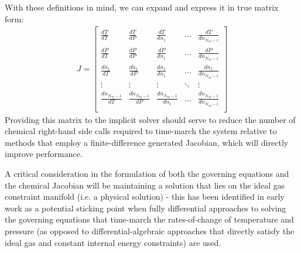 With these definitions in mind, we can expand  and express
it in true matrix form:
\begin{align}
J = \begin{bmatrix} \frac{d\dot{T}}{dT} & \frac{d\dot{T}}{dP} & \frac{d\dot{T}}{dn_{1}} & \hdots & \frac{d\dot{T}}{dn_{N_{sp}-1}} \\
                    \frac{d\dot{P}}{dT} & \frac{d\dot{P}}{dP} & \frac{d\dot{P}}{dn_{1}} & \hdots & \frac{d\dot{P}}{dn_{N_{sp}-1}} \\
		    \frac{d\dot{n}_{1}}{dT} & \frac{d\dot{n}_{1}}{dP} & \frac{d\dot{n}_{1}}{dn_{1}} & \hdots & \frac{d\dot{n}_{1}}{dn_{N_{sp}-1}} \\
		    \vdots & \vdots & \vdots & \ddots & \vdots \\
		    \frac{d\dot{n}_{N_{sp}-1}}{dT} & \frac{d\dot{n}_{N_{sp}-1}}{dP} & \frac{d\dot{n}_{N_{sp}-1}}{dn_{1}} & \hdots & \frac{d\dot{n}_{N_{sp}-1}}{dn_{N_{sp}-1}} \\
    \end{bmatrix}
\end{align}
Providing this matrix to the implicit solver should serve to reduce the
number of chemical right-hand side calls required to time-march the
system relative to methods that employ a finite-difference generated
Jacobian, which will directly improve performance.

A critical consideration in the formulation of both the governing equations
and the chemical Jacobian will be maintaining a solution
that lies on the ideal gas constraint manifold (i.e. a physical solution) - this
has been identified in early work as a potential sticking point when fully
differential approaches to solving the governing equations that time-march
the rates-of-change of temperature and pressure (as opposed to
differential-algebraic approaches that directly satisfy the ideal gas and
constant internal energy constraints) are used.

